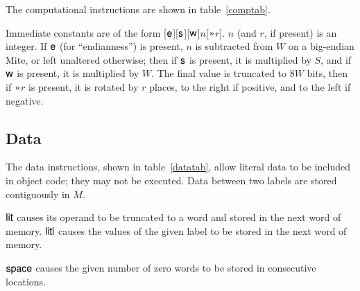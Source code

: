 \documentclass[english]{scrartcl}
\newcommand{\synfont}{\sffamily}
\newcommand{\syn}[1]{\ensuremath{\text{\synfont #1}}}
\newcommand{\insttab}[2]{\ctable[caption=#1]{>{\synfont}p{13ex}p{44ex}}{}{\FL #2\bottomrule}}
\begin{document}
\insttab{Computational instructions\label{comptab}}{}

The computational instructions are shown in table~\ref{comptab}.

Immediate constants are of the form
[\syn{e}][\syn{s}][\syn{w}]$n$[\syn{\textgreater\textgreater}$r$]. $n$ (and $r$, if
present) is an integer. If \syn{e} (for ``endianness'') is present,
$n$ is subtracted from $W$ on a big-endian Mite, or left unaltered
otherwise; then if \syn{s} is present, it is multiplied by $S$, and if
\syn{w} is present, it is multiplied by $W$. The final value is
truncated to $8W$ bits, then if \syn{\textgreater\textgreater}$r$ is present, it is
rotated by $r$ places, to the right if positive, and to the left if
negative.


\subsection{Data}

The data instructions, shown in table~\ref{datatab}, allow literal
data to be included in object code; they may not be executed. Data
between two labels are stored contiguously in $M$.

\insttab{Data instructions\label{datatab}}{}

\syn{lit} causes its operand to be truncated to a word and stored in
the next word of memory. \syn{litl} causes the values of the given
label to be stored in the next word of memory.

\syn{space} causes the given number of zero words to be stored in
consecutive locations.






\end{document}
